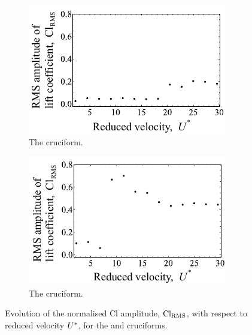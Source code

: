\documentclass[oneside]{utmthesis}
\begin{document}
\begin{figure}
  \centering
  \begin{subfigure}[h]{0.4\textwidth}
    \includegraphics[width=\textwidth]{figs/clRMS2}
    \caption{The \angtw{} cruciform.}
    \label{fig:clRMS2}
  \end{subfigure}
  \hspace{6mm}
  \begin{subfigure}[h]{0.4\textwidth}
    \includegraphics[width=\textwidth]{figs/clRMS1}
    \caption{The \angon{} cruciform.}
    \label{fig:clRMS1}
  \end{subfigure}

  \label{fig:clRMS21}
  \caption{Evolution of the normalised Cl \rms{} amplitude, $\text{Cl}_{\text{RMS}}$, with respect to reduced velocity $U^{*}$, for the \angtw{} and \angon{} cruciforms.}
\end{figure}
\end{document}
